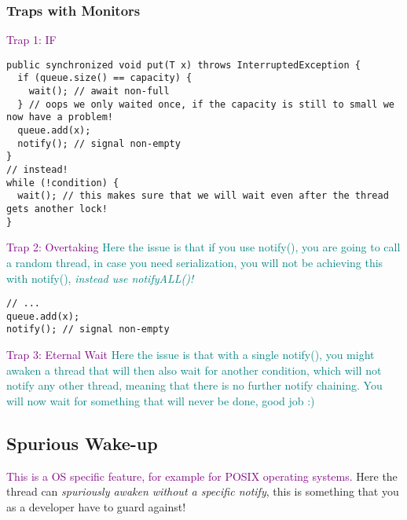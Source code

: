 \documentclass[main.tex,fontsize=8pt,paper=a4,paper=portrait,DIV=calc,]{scrartcl}
\begin{document}
\subsubsection{Traps with Monitors}
\textcolor{purple}{Trap 1: IF}
\begin{lstlisting}
public synchronized void put(T x) throws InterruptedException {
  if (queue.size() == capacity) {
    wait(); // await non-full
  } // oops we only waited once, if the capacity is still to small we now have a problem!
  queue.add(x);
  notify(); // signal non-empty
}
// instead!
while (!condition) {
  wait(); // this makes sure that we will wait even after the thread gets another lock!
}
\end{lstlisting}
\textcolor{purple}{Trap 2: Overtaking}\newline
\textcolor{teal}{Here the issue is that if you use notify(), you are going to call a random thread, in case you need serialization, you will not be achieving this with notify(), \emph{instead use notifyALL()!}}
\begin{lstlisting}
// ...
queue.add(x);
notify(); // signal non-empty
\end{lstlisting}
\textcolor{purple}{Trap 3: Eternal Wait}\newline
\textcolor{teal}{Here the issue is that with a single notify(), you might awaken a thread that will then also wait for another condition, which will not notify any other thread, meaning that there is no further notify chaining.\newline
You will now wait for something that will never be done, good job :)}

\subsection{Spurious Wake-up}
\textcolor{purple}{This is a OS specific feature, for example for POSIX operating systems.}\newline
Here the thread can \emph{spuriously awaken without a specific notify}, this is something that you as a developer have to guard against!
\end{document}
